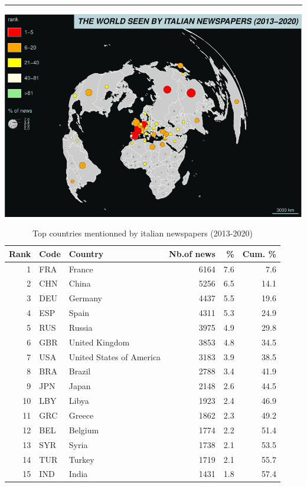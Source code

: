 \documentclass[
]{article}
\begin{document}
\begin{center}\rule{0.5\linewidth}{0.5pt}\end{center}

\includegraphics{Part2_maps_files/figure-latex/unnamed-chunk-13-1.pdf}

\begin{table}

\caption{\label{tab:unnamed-chunk-14}Top countries mentionned by italian newspapers (2013-2020)}
\centering
\begin{tabular}[t]{r|l|l|r|r|r}
\hline
Rank & Code & Country & Nb.of news & \% & Cum. \%\\
\hline
1 & FRA & France & 6164 & 7.6 & 7.6\\
\hline
2 & CHN & China & 5256 & 6.5 & 14.1\\
\hline
3 & DEU & Germany & 4437 & 5.5 & 19.6\\
\hline
4 & ESP & Spain & 4311 & 5.3 & 24.9\\
\hline
5 & RUS & Russia & 3975 & 4.9 & 29.8\\
\hline
6 & GBR & United Kingdom & 3853 & 4.8 & 34.5\\
\hline
7 & USA & United States of America & 3183 & 3.9 & 38.5\\
\hline
8 & BRA & Brazil & 2788 & 3.4 & 41.9\\
\hline
9 & JPN & Japan & 2148 & 2.6 & 44.5\\
\hline
10 & LBY & Libya & 1923 & 2.4 & 46.9\\
\hline
11 & GRC & Greece & 1862 & 2.3 & 49.2\\
\hline
12 & BEL & Belgium & 1774 & 2.2 & 51.4\\
\hline
13 & SYR & Syria & 1738 & 2.1 & 53.5\\
\hline
14 & TUR & Turkey & 1719 & 2.1 & 55.7\\
\hline
15 & IND & India & 1431 & 1.8 & 57.4\\
\hline
\end{tabular}
\end{table}
\end{document}
